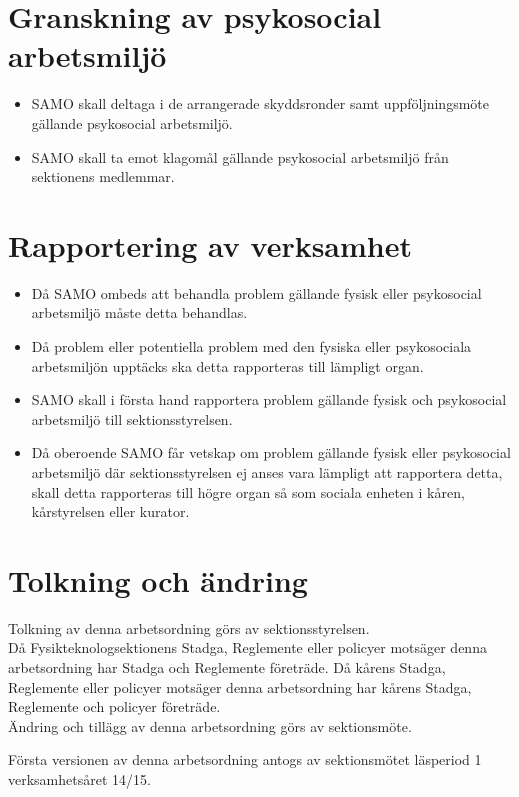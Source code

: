 \section{Granskning av psykosocial arbetsmiljö}
\begin{itemize}
\item SAMO skall deltaga i de arrangerade skyddsronder samt uppföljningsmöte gällande psykosocial arbetsmiljö.

\item SAMO skall ta emot klagomål gällande psykosocial arbetsmiljö från sektionens medlemmar.
\end{itemize}

\section{Rapportering av verksamhet}
\begin{itemize}
\item Då SAMO ombeds att behandla problem gällande fysisk eller psykosocial arbetsmiljö måste detta behandlas.

\item Då problem eller potentiella problem med den fysiska eller psykosociala arbetsmiljön upptäcks ska detta rapporteras till lämpligt organ.

\item SAMO skall i första hand rapportera problem gällande fysisk och psykosocial arbetsmiljö till sektionsstyrelsen.

\item Då oberoende SAMO får vetskap om problem gällande fysisk eller psykosocial arbetsmiljö där sektionsstyrelsen ej anses vara lämpligt att rapportera detta, skall detta rapporteras till högre organ så som sociala enheten i kåren, kårstyrelsen eller kurator.

\end{itemize}

\section{Tolkning och ändring}
Tolkning av denna arbetsordning görs av sektionsstyrelsen.\\ Då Fysikteknologsektionens Stadga, Reglemente eller policyer motsäger denna arbetsordning har Stadga och Reglemente företräde. Då kårens Stadga, Reglemente eller policyer motsäger denna arbetsordning har kårens Stadga, Reglemente och policyer företräde.\\
Ändring och tillägg av denna arbetsordning görs av sektionsmöte.


Första versionen av denna arbetsordning antogs av sektionsmötet läsperiod 1 verksamhetsåret 14/15.

\newpage